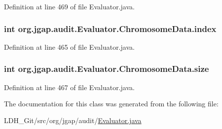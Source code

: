 Definition at line 469 of file Evaluator.\-java.

\hypertarget{classorg_1_1jgap_1_1audit_1_1_evaluator_1_1_chromosome_data_a4ea7171a22feb8dafcaf26efe86d7f1f}{
\subsubsection[{index}]{\setlength{\rightskip}{0pt plus 5cm}int org.\-jgap.\-audit.\-Evaluator.\-Chromosome\-Data.\-index}}\label{classorg_1_1jgap_1_1audit_1_1_evaluator_1_1_chromosome_data_a4ea7171a22feb8dafcaf26efe86d7f1f}


Definition at line 465 of file Evaluator.\-java.

\hypertarget{classorg_1_1jgap_1_1audit_1_1_evaluator_1_1_chromosome_data_a446ea7472f2a4f26eeee6dbb42b89dd2}{
\subsubsection[{size}]{\setlength{\rightskip}{0pt plus 5cm}int org.\-jgap.\-audit.\-Evaluator.\-Chromosome\-Data.\-size}}\label{classorg_1_1jgap_1_1audit_1_1_evaluator_1_1_chromosome_data_a446ea7472f2a4f26eeee6dbb42b89dd2}


Definition at line 467 of file Evaluator.\-java.



The documentation for this class was generated from the following file\-:\begin{DoxyCompactItemize}
\item 
L\-D\-H\-\_\-\-Git/src/org/jgap/audit/\hyperlink{_evaluator_8java}{Evaluator.\-java}\end{DoxyCompactItemize}
